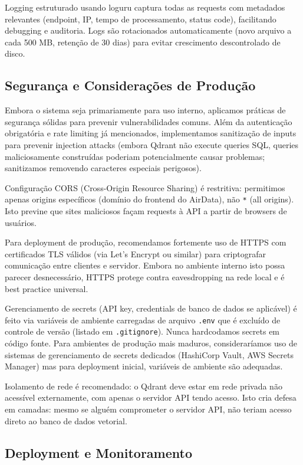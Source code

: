 \documentclass[12pt,a4paper]{article}
\begin{document}
Logging estruturado usando loguru captura todas as requests com metadados relevantes (endpoint, IP, tempo de processamento, status code), facilitando debugging e auditoria. Logs são rotacionados automaticamente (novo arquivo a cada 500 MB, retenção de 30 dias) para evitar crescimento descontrolado de disco.

\subsection{Segurança e Considerações de Produção}

Embora o sistema seja primariamente para uso interno, aplicamos práticas de segurança sólidas para prevenir vulnerabilidades comuns. Além da autenticação obrigatória e rate limiting já mencionados, implementamos sanitização de inputs para prevenir injection attacks (embora Qdrant não execute queries SQL, queries maliciosamente construídas poderiam potencialmente causar problemas; sanitizamos removendo caracteres especiais perigosos).

Configuração CORS (Cross-Origin Resource Sharing) é restritiva: permitimos apenas origins específicos (domínio do frontend do AirData), não \texttt{*} (all origins). Isto previne que sites maliciosos façam requests à API a partir de browsers de usuários.

Para deployment de produção, recomendamos fortemente uso de HTTPS com certificados TLS válidos (via Let's Encrypt ou similar) para criptografar comunicação entre clientes e servidor. Embora no ambiente interno isto possa parecer desnecessário, HTTPS protege contra eavesdropping na rede local e é best practice universal.

Gerenciamento de secrets (API key, credentials de banco de dados se aplicável) é feito via variáveis de ambiente carregadas de arquivo \texttt{.env} que é excluído de controle de versão (listado em \texttt{.gitignore}). Nunca hardcodamos secrets em código fonte. Para ambientes de produção mais maduros, consideraríamos uso de sistemas de gerenciamento de secrets dedicados (HashiCorp Vault, AWS Secrets Manager) mas para deployment inicial, variáveis de ambiente são adequadas.

Isolamento de rede é recomendado: o Qdrant deve estar em rede privada não acessível externamente, com apenas o servidor API tendo acesso. Isto cria defesa em camadas: mesmo se alguém comprometer o servidor API, não teriam acesso direto ao banco de dados vetorial.

\subsection{Deployment e Monitoramento}
\end{document}
